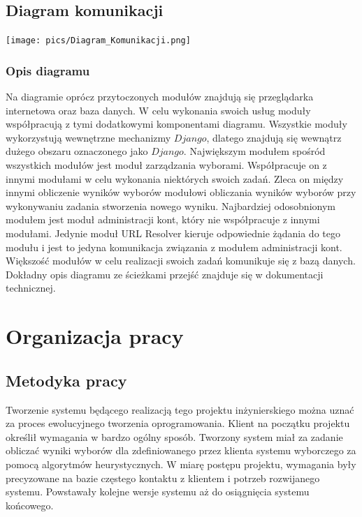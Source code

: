 \documentclass[polish,11pt]{aghthesis}
\begin{document}
\subsection{Diagram komunikacji}
\begin{center}
\centerline{\texttt{[image: pics/Diagram\_Komunikacji.png]}}
\end{center}

\subsubsection{Opis diagramu}
Na diagramie oprócz przytoczonych modułów znajdują się przeglądarka internetowa oraz
baza danych. W celu wykonania swoich usług moduły współpracują z tymi dodatkowymi
komponentami diagramu. Wszystkie moduły wykorzystują wewnętrzne mechanizmy $Django$,
dlatego znajdują się wewnątrz dużego obszaru oznaczonego jako $Django$. Największym
modułem spośród wszystkich modułów jest moduł zarządzania wyborami. Współpracuje on
z innymi modułami w celu wykonania niektórych swoich zadań. Zleca on między innymi
obliczenie wyników wyborów modułowi obliczania wyników wyborów przy wykonywaniu
zadania stworzenia nowego wyniku. Najbardziej odosobnionym modułem jest moduł
administracji kont, który nie współpracuje z innymi modułami. Jedynie moduł URL Resolver
kieruje odpowiednie żądania do tego modułu i jest to jedyna komunikacja związania z
modułem administracji kont. Większość modułów w celu realizacji swoich zadań komunikuje
się z bazą danych. Dokładny opis diagramu ze ścieżkami przejść znajduje się w dokumentacji
technicznej.

\section{Organizacja pracy}
\subsection{Metodyka pracy}
Tworzenie systemu będącego realizacją tego projektu inżynierskiego można uznać za
proces ewolucyjnego tworzenia oprogramowania. Klient na początku projektu określił
wymagania w bardzo ogólny sposób. Tworzony system miał za zadanie obliczać wyniki
wyborów dla zdefiniowanego przez klienta systemu wyborczego za pomocą algorytmów
heurystycznych. W miarę postępu projektu, wymagania były precyzowane na bazie częstego
kontaktu z klientem i potrzeb rozwijanego systemu. Powstawały kolejne wersje systemu aż
do osiągnięcia systemu końcowego.
\end{document}
